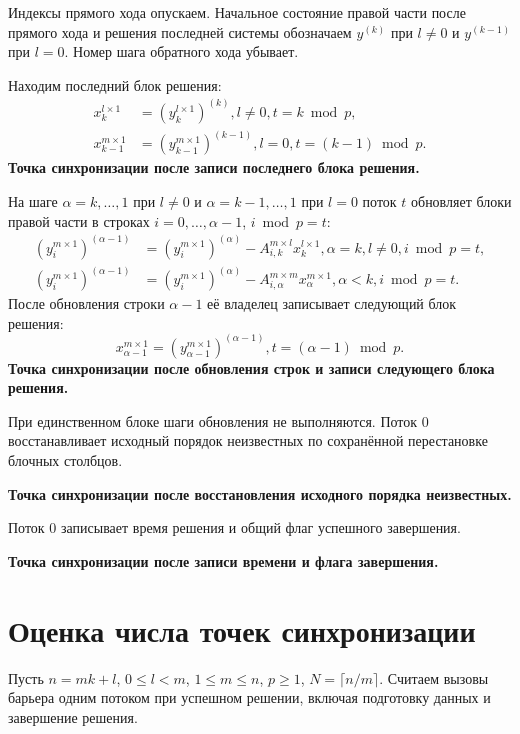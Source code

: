 \documentclass[a4paper,12pt]{article}
\newcommand{\br}[1]{\left(#1\right)}
\begin{document}
Индексы прямого хода опускаем. Начальное состояние правой части после прямого хода и решения последней системы обозначаем $y^{(k)}$ при $l \neq 0$ и $y^{(k - 1)}$ при $l = 0$. Номер шага обратного хода убывает.

Находим последний блок решения:
\begin{align*}
    x_k^{l \times 1}         & = \br{y_k^{l \times 1}}^{(k)},
        l \neq 0, t = k \bmod p, \\
    x_{k - 1}^{m \times 1}   & = \br{y_{k - 1}^{m \times 1}}^{(k - 1)},
        l = 0, t = (k - 1) \bmod p.
\end{align*}
\textbf{Точка синхронизации после записи последнего блока решения.}

На шаге $\alpha = k, \dots, 1$ при $l \neq 0$ и $\alpha = k - 1, \dots, 1$ при $l = 0$ поток $t$ обновляет блоки правой части в строках $i = 0, \dots, \alpha - 1$, $i \bmod p = t$:
\begin{align*}
    \br{y_i^{m \times 1}}^{(\alpha - 1)} & = \br{y_i^{m \times 1}}^{(\alpha)}
        - A_{i,k}^{m \times l}x_k^{l \times 1},
        \alpha = k, l \neq 0, i \bmod p = t, \\
    \br{y_i^{m \times 1}}^{(\alpha - 1)} & = \br{y_i^{m \times 1}}^{(\alpha)}
        - A_{i,\alpha}^{m \times m}x_\alpha^{m \times 1},
        \alpha < k, i \bmod p = t.
\end{align*}
После обновления строки $\alpha - 1$ её владелец записывает следующий блок решения:
\[
    x_{\alpha - 1}^{m \times 1} = \br{y_{\alpha - 1}^{m \times 1}}^{(\alpha - 1)},
    t = (\alpha - 1) \bmod p.
\]
\textbf{Точка синхронизации после обновления строк и записи следующего блока решения.}

При единственном блоке шаги обновления не выполняются. Поток $0$ восстанавливает исходный порядок неизвестных по сохранённой перестановке блочных столбцов.

\textbf{Точка синхронизации после восстановления исходного порядка неизвестных.}

Поток $0$ записывает время решения и общий флаг успешного завершения.

\textbf{Точка синхронизации после записи времени и флага завершения.}

\section{Оценка числа точек синхронизации}
Пусть $n = mk + l$, $0 \leq l < m$, $1 \leq m \leq n$, $p \geq 1$, $N = \lceil n/m \rceil$. Считаем вызовы барьера одним потоком при успешном решении, включая подготовку данных и завершение решения.
\end{document}
